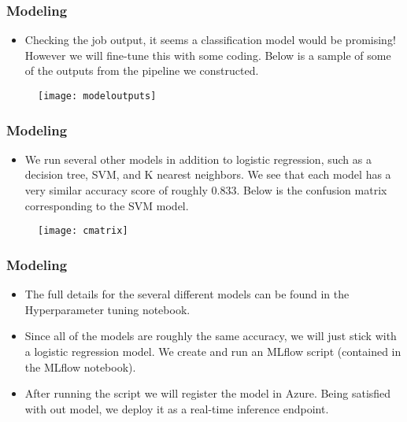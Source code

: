 \documentclass{beamer}
\begin{document}
\begin{frame}

\frametitle{Modeling}
\begin{itemize}

\item Checking the job output, it seems a classification model would be promising! However we will fine-tune this with some coding. Below is a sample of some of the outputs from the pipeline we constructed.

\end{itemize}

\begin{figure}
\texttt{[image: modeloutputs]}
\end{figure}



\end{frame}

\begin{frame}

\frametitle{Modeling}

\begin{itemize}

\item We run several other models in addition to logistic regression, such as a decision tree, SVM, and K nearest neighbors. We see that each model has a very similar accuracy score of roughly $0.833$. Below is the confusion matrix corresponding to the SVM model.

\end{itemize}

\begin{figure}
\texttt{[image: cmatrix]}
\end{figure}


\end{frame}


\begin{frame}

\frametitle{Modeling}

\begin{itemize}

\item The full details  for the several different models can be found in the Hyperparameter tuning notebook.

\bigskip

\item Since all of the models are roughly the same accuracy, we will just stick with a logistic regression model. We create and run an MLflow script (contained in the MLflow notebook). 

\bigskip

\item After running the script we will register the model in Azure. Being satisfied with out model, we deploy it as a real-time inference endpoint.


\end{itemize}


\end{frame}
\end{document}
